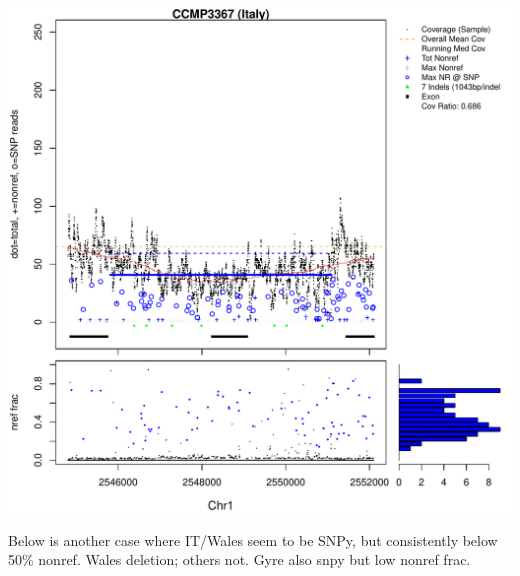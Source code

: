 \documentclass{article}\usepackage[]{graphicx}\usepackage[]{color}
\makeatletter
\def\maxwidth{ %
  \ifdim\Gin@nat@width>\linewidth
    \linewidth
  \else
    \Gin@nat@width
  \fi
}
\newenvironment{knitrout}{}{} %
\makeatother
\begin{document}
\begin{knitrout}
{\includegraphics[width=\maxwidth]{figs-knitr/unnamed-chunk-49-7} 

}



\end{knitrout}

Below is another case where IT/Wales seem to be SNPy, but consistently below 50\% nonref. Wales deletion; others not.  Gyre also snpy but low nonref frac.
\end{document}
